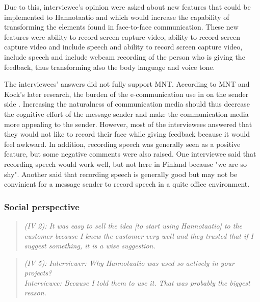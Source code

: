 \documentclass[english,12pt,a4paper,pdftex]{article}
\newcommand{\q}[2]{
\begin{quote}
\emph{(IV #1): #2}
\end{quote}}
\begin{document}
Due to this, interviewee's opinion were asked about new features that could be implemented to Hannotaatio and which would increase the capability of transforming the elements found in face-to-face communication. These new features were ability to record screen capture video, ability to record screen capture video and include speech and ability to record screen capture video, include speech and include webcam recording of the person who is giving the feedback, thus transforming also the body language and voice tone.

The interviewees' answers did not fully support \ac{MNT}. According to \ac{MNT} and Kock's later research, the burden of the e-communication use in on the sender side \citep{kock2007}. Increasing the naturalness of communication media should thus decrease the cognitive effort of the message sender and make the communication media more appealing to the sender. However, most of the interviewees answered that they would not like to record their face while giving feedback because it would feel awkward. In addition, recording speech was generally seen as a positive feature, but some negative comments were also raised. One interviewee said that recording speech would work well, but not here in Finland because "we are so shy". Another said that recording speech is generally good but may not be convinient for a message sender to record speech in a quite office environment.

\subsubsection{Social perspective}

\q{2}{It was easy to sell the idea [to start using Hannotaatio] to the customer because I knew the customer very well and they trusted that if I suggest something, it is a wise suggestion.}

\q{5}{Interviewer: Why Hannotaatio was used so actively in your projects? \\ Interviewee: Because I told them to use it. That was probably the biggest reason.}
\end{document}
